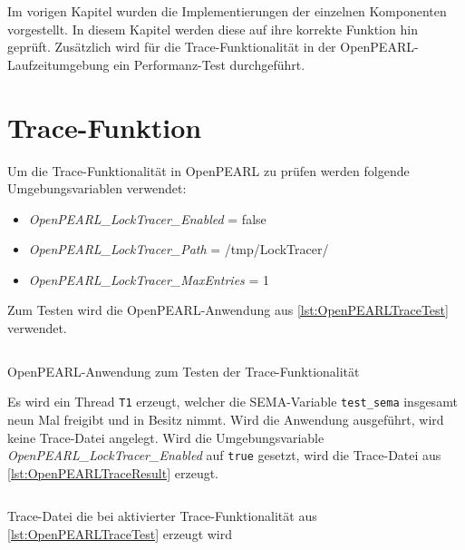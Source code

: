 Im vorigen Kapitel wurden die Implementierungen der einzelnen Komponenten
vorgestellt. In diesem Kapitel werden diese auf ihre korrekte Funktion hin
geprüft. Zusätzlich wird für die Trace-Funktionalität in der
OpenPEARL-Laufzeitumgebung ein Performanz-Test durchgeführt.

\section{Trace-Funktion}\label{Validierung:Trace-Funktion}
\label{section:ValidierungTraceFunktion}
Um die Trace-Funktionalität in OpenPEARL zu prüfen werden folgende
Umgebungsvariablen verwendet:
\begin{itemize}
  \item \emph{OpenPEARL\-\_LockTracer\-\_Enabled} = false
  \item \emph{OpenPEARL\-\_LockTracer\-\_Path} = /tmp/LockTracer/
  \item \emph{OpenPEARL\-\_LockTracer\-\_MaxEntries} = 1
\end{itemize}
Zum Testen wird die OpenPEARL-Anwendung aus \cref{lst:OpenPEARLTraceTest}
verwendet. 
\begin{listing}[ht]
  \inputminted[frame=lines,linenos]{vim}{./OpenPEARL/TraceTest.prl}
  \caption{OpenPEARL-Anwendung zum Testen der Trace-Funktionalität}
  \label{lst:OpenPEARLTraceTest}
\end{listing}
Es wird ein Thread \texttt{T1} erzeugt, welcher die \textrm{SEMA}-Variable
\texttt{test\_sema} insgesamt neun Mal freigibt und in Besitz nimmt. Wird die
Anwendung ausgeführt, wird keine Trace-Datei angelegt. Wird die
Umgebungsvariable \emph{OpenPEARL\-\_LockTracer\-\_Enabled} auf \texttt{true}
gesetzt, wird die Trace-Datei aus \cref{lst:OpenPEARLTraceResult} erzeugt.
\begin{listing}[ht]
  \begin{minipage}[ht]{\linewidth}
    \begin{multicols}{2}
      \inputminted[linenos]{text}{./OpenPEARL/TraceTestResult.log}
    \end{multicols}
    \caption{Trace-Datei die bei aktivierter Trace-Funktionalität aus \cref{lst:OpenPEARLTraceTest} erzeugt wird}
  \label{lst:OpenPEARLTraceResult}
  \end{minipage}
\end{listing}

